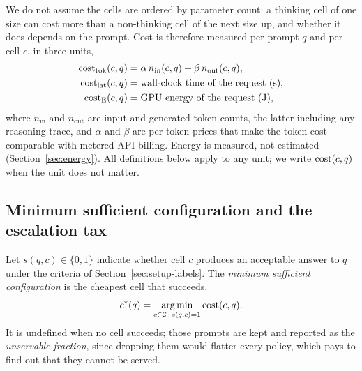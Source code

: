 We do not assume the cells are ordered by parameter count: a thinking cell of
one size can cost more than a non-thinking cell of the next size up, and
whether it does depends on the prompt. Cost is therefore measured per prompt
$q$ and per cell $c$, in three units,
\begin{align}
  \mathrm{cost}_{\mathrm{tok}}(c, q) &= \alpha\, n_{\mathrm{in}}(c, q)
                              + \beta\, n_{\mathrm{out}}(c, q),
  \label{eq:tokcost}\\
  \mathrm{cost}_{\mathrm{lat}}(c, q) &= \text{wall-clock time of the request (s)},
  \label{eq:latcost}\\
  \mathrm{cost}_{\mathrm{E}}(c, q)   &= \text{GPU energy of the request (J)},
  \label{eq:energycost}
\end{align}
where $n_{\mathrm{in}}$ and $n_{\mathrm{out}}$ are input and generated token
counts, the latter including any reasoning trace, and $\alpha$ and $\beta$
are per-token prices that make the token cost comparable with metered API
billing. Energy is measured, not estimated (Section~\ref{sec:energy}). All
definitions below apply to any unit; we write $\mathrm{cost}(c, q)$ when the unit
does not matter.

\subsection{Minimum sufficient configuration and the escalation tax}
\label{sec:tax}

Let $s(q, c) \in \{0, 1\}$ indicate whether cell $c$ produces an acceptable
answer to $q$ under the criteria of Section~\ref{sec:setup-labels}. The
\emph{minimum sufficient configuration} is the cheapest cell that succeeds,
\begin{equation}
  c^{*}(q) = \operatorname*{arg\,min}_{c \in \mathcal{C} \,:\, s(q, c) = 1} \mathrm{cost}(c, q).
  \label{eq:cstar}
\end{equation}
It is undefined when no cell succeeds; those prompts are kept and reported as
the \emph{unservable fraction}, since dropping them would flatter every
policy, which pays to find out that they cannot be served.


